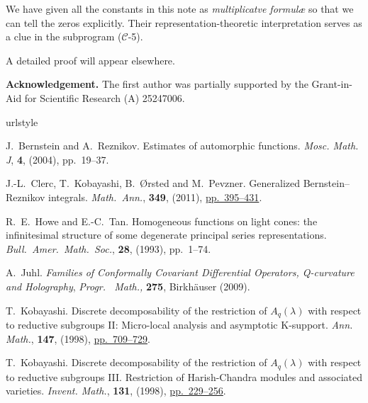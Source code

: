 \documentclass[reqno,12pt]{pja00} %
\theoremstyle{plain}
\theoremstyle{definition}
\theoremstyle{exampstyle} \newtheorem{examp}[theorem]{Theorem}
\begin{document}
We have given all the constants in this note as {\textit{multiplicatve formul\ae}}
so that we can tell the zeros explicitly. 
Their representation-theoretic interpretation serves as a clue
in the subprogram ($\mathcal C$-5).

	A detailed proof will appear elsewhere.

	{\bf Acknowledgement.} The first author was partially supported by the Grant-in-Aid for Scientific Research (A) 25247006.
\nocite{kobayashi1998discrete2}
\nocite{kobayashi2015program}
\small
\begin{thebibliography}{14}
\expandafter\ifx\csname urlstyle\endcsname\relax
  \providecommand{\doi}[1]{doi:\discretionary{}{}{}#1}\else
  \providecommand{\doi}{doi:\discretionary{}{}{}\begingroup
  \urlstyle{rm}\Url}\fi

J.~Bernstein and A.~Reznikov.
\newblock Estimates of automorphic functions.
\newblock \emph{{\normalfont Mosc. Math. J}}, \textbf{\textbf{4}}, (2004),
  pp.~19--37.

J.-L.~Clerc, T.~Kobayashi, B.~{\O}rsted and M.~Pevzner.
\newblock Generalized {B}ernstein--{R}eznikov integrals.
\newblock \emph{{\normalfont Math.~Ann.}}, \textbf{349}, (2011),
\href{http://dx.doi.org/10.1007/s00208-010-0516-4}{pp.~395--431}.

R.~E.~Howe and E.-C.~Tan.
\newblock Homogeneous functions on light cones: the infinitesimal structure of
  some degenerate principal series representations.
\newblock \emph{{\normalfont Bull.~Amer.~Math.~Soc.}}, \textbf{28},
  (1993), pp.~1--74.

A.~Juhl.
\newblock \emph{Families of {C}onformally {C}ovariant {D}ifferential
  {O}perators, {Q}-curvature and {H}olography}, \emph{{\normalfont Progr.~ Math.},} \textbf{275},
\newblock Birkh{\"a}user (2009).

T.~Kobayashi.
\newblock Discrete decomposability of the restriction of {$A_q(\lambda)$} with
  respect to reductive subgroups {II}: Micro-local analysis and asymptotic
  {K}-support.
  \newblock \emph{{\normalfont Ann. Math.}}, \textbf{147}, (1998),
\href{http://dx.doi.org/10.2307/120963}{pp.~709--729}.

T.~Kobayashi.
\newblock Discrete decomposability of the restriction of {$A_q(\lambda)$} with
  respect to reductive subgroups {III}. {R}estriction of {H}arish-{C}handra
  modules and associated varieties.
\newblock \emph{{\normalfont Invent. Math.}}, \textbf{131}, (1998), 
\href{http://dx.doi.org/10.1007/s002220050203}{pp.~229--256}.


\end{thebibliography}
\end{document}
